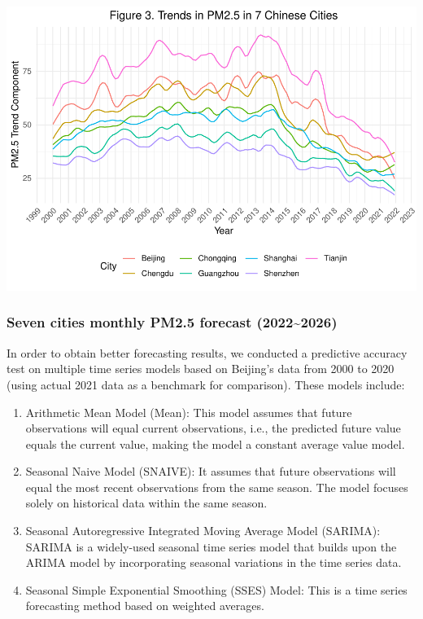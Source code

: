 \documentclass[
  12pt,
]{article}
\providecommand{\tightlist}{%
  \setlength{\itemsep}{0pt}\setlength{\parskip}{0pt}}
\begin{document}
\includegraphics{LiFangRenZhang_ENV872_Project_files/figure-latex/trend figure-1.pdf}

\hypertarget{seven-cities-monthly-pm2.5-forecast-20222026}{%
\subsubsection{Seven cities monthly PM2.5 forecast
(2022\textasciitilde2026)}\label{seven-cities-monthly-pm2.5-forecast-20222026}}

In order to obtain better forecasting results, we conducted a predictive
accuracy test on multiple time series models based on Beijing's data
from 2000 to 2020 (using actual 2021 data as a benchmark for
comparison). These models include:

\begin{enumerate}
\def\labelenumi{\arabic{enumi}.}
\tightlist
\item
  Arithmetic Mean Model (Mean): This model assumes that future
  observations will equal current observations, i.e., the predicted
  future value equals the current value, making the model a constant
  average value model.
\item
  Seasonal Naive Model (SNAIVE): It assumes that future observations
  will equal the most recent observations from the same season. The
  model focuses solely on historical data within the same season.
\item
  Seasonal Autoregressive Integrated Moving Average Model (SARIMA):
  SARIMA is a widely-used seasonal time series model that builds upon
  the ARIMA model by incorporating seasonal variations in the time
  series data.
\item
  Seasonal Simple Exponential Smoothing (SSES) Model: This is a time
  series forecasting method based on weighted averages.
\end{enumerate}
\end{document}
